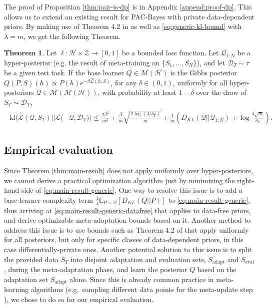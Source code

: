 \documentclass{article} %
\theoremstyle{definition}
\newtheorem{theorem}{Theorem}[section]
\newcommand{\Expect}[2]{\mathbb{E}_{#1}\left [#2 \right ]}
\begin{document}
The proof of Proposition \ref{thm:pair-is-dp} is in Appendix \ref{append:proof-dp}. This  allows us to extend an existing result for PAC-Bayes with private data-dependent priors.
By making use of Theorem 4.2 in \citet{Dziugaite2018} as well as  \eqref{eq:generic-kl-bound} with $\lambda=m$, we get the following Theorem.

\begin{theorem} \label{thm:kl-main-result}
	Let $\ell:\mathcal{H}\times \mathcal{Z}\rightarrow [0,1]$ be a bounded loss function.
	Let $\mathcal{Q}_{1:N}$ be a hyper-posterior (e.g. the result of meta-training on $\{S_1,...,S_N\}$), and let $\mathcal{D}_T\sim \tau$ be a given test task. 
	If the base learner $Q\in \mathcal{M}(\mathcal{H})$ is the Gibbs posterior $Q(P, S)(h)\propto P(h)e^{-\beta\hat{\mathcal{L}}(h, S)}$, 
	for any $\delta\in(0,1)$, uniformly for all hyper-posteriors $\mathcal{Q}\in \mathcal{M}(\mathcal{M}(\mathcal{H}))$, with probability at least $1-\delta$ over the draw of $S_T\sim \mathcal{D}_T$,
	\begin{align*} 
	\begin{split}
	\mathrm{kl}(\hat{\mathcal{L}}(\mathcal{Q},S_T)||\mathcal{L}(&\mathcal{Q},\mathcal{D}_T))\leq \frac{2\beta^2}{m^2}+\frac{\beta}{m}\sqrt{\frac{2\log (4/\delta_T)}{m}} 
	+\frac{1}{m}\left (D_{KL}(\mathcal{Q}||\mathcal{Q}_{1:N})+\log\frac{4\sqrt{m}}{\delta_T} \right ) .
	\end{split}
	\end{align*}
\end{theorem}

\subsection{Empirical evaluation}

Since Theorem \ref{thm:main-result} does not apply uniformly over hyper-posteriors, we cannot derive a practical optimization algorithm just by minimizing the right-hand side of  \eqref{eq:main-result-generic}. 
One way to resolve this issue is to add a base-learner complexity term $\frac{1}{\lambda}\Expect{P\sim \mathcal{Q}}{D_{KL}(Q||P)}$ to  \eqref{eq:main-result-generic}, thus arriving at \eqref{eq:main-result-generic-datafree} that applies to data-free priors, and derive optimizable meta-adaptation bounds based on it.
Another method to address this issue is to use bounds such as Theorem 4.2 of \citet{Dziugaite2018} that apply uniformly for all posteriors, but only for specific classes of data-dependent priors, in this case differentially-private ones.
Another potential solution to this issue is to split the provided data $S_T$ into disjoint adaptation and evaluation sets, $S_{\mathrm{adapt}}$ and $S_{\mathrm{eval}}$, during the meta-adaptation phase, and learn the posterior $Q$ based on the adaptation set $S_{\mathrm{adapt}}$ alone. Since this is already common practice in meta-learning algorithms (e.g.\ sampling different data points for the meta-update step \citet{Finn2017}), we chose to do so for our empirical evaluation. %
\end{document}
